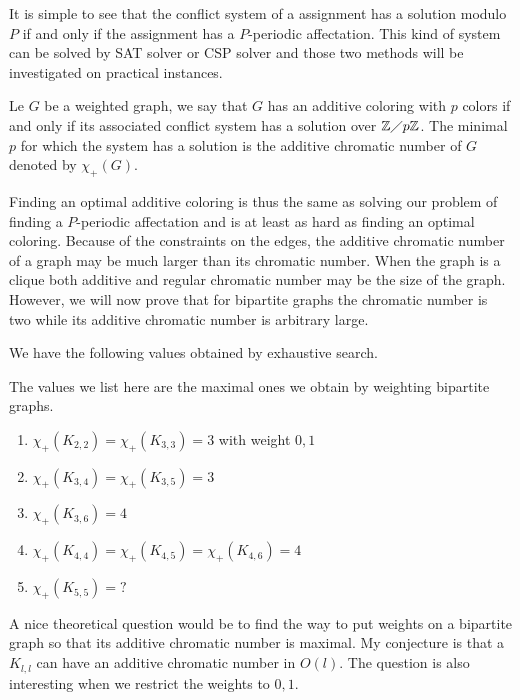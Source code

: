 \documentclass{article}
\newcommand\rmatching{assignment\xspace}
\begin{document}
It is simple to see that the conflict system of a \rmatching has a solution modulo $P$ if and only if 
the \rmatching has a $P$-periodic affectation. This kind of system can be solved by SAT solver or CSP solver and those two methods will be investigated on practical instances.

\begin{definition}
 Le $G$ be a weighted graph, we say that $G$ has an additive coloring with $p$ colors if and only if its associated
 conflict system has a solution over $\mathbb{Z} \diagup p\mathbb{Z}$. The minimal $p$ for which the system has a solution is the additive chromatic number of $G$ denoted by $\chi_{+}(G)$.
\end{definition}

Finding an optimal additive coloring is thus the same as solving our problem of finding a $P$-periodic affectation
and is at least as hard as finding an optimal coloring.  Because of the constraints on the edges, 
the additive chromatic number of a graph may be much larger than its chromatic number.
When the graph is a clique both additive and regular chromatic number may be the size of the graph.
However, we will now prove that for bipartite graphs the chromatic number is two while its additive 
chromatic number is arbitrary large.

We have the following values obtained by exhaustive search.

\begin{fact}
 The values we list here are the maximal ones we obtain 
 by weighting bipartite graphs.
 \begin{enumerate}
  \item  $\chi_{+}(K_{2,2})= \chi_{+}(K_{3,3}) = 3$ with weight $0,1$
  \item $\chi_{+}(K_{3,4}) = \chi_{+}(K_{3,5}) =3$ 
  \item $\chi_{+}(K_{3,6}) = 4$ 
  \item  $\chi_{+}(K_{4,4})=\chi_{+}(K_{4,5})=\chi_{+}(K_{4,6})=4$
  \item $\chi_{+}(K_{5,5})= ?$
 \end{enumerate}
 \end{fact}

 A nice theoretical question would be to find the way to put weights
 on a bipartite graph so that its additive chromatic number is maximal. 
 My conjecture is that a $K_{l,l}$ can have an additive chromatic number in $O(l)$.
 The question is also interesting when we restrict the weights to $0,1$.
 
\end{document}
